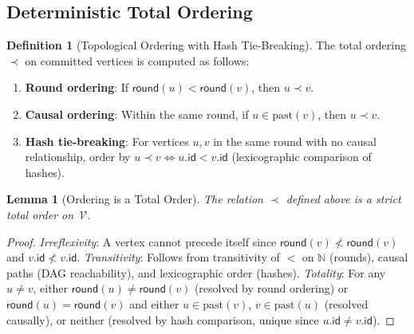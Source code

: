 \documentclass[11pt,a4paper]{article}
\newtheorem{lemma}[theorem]{Lemma}
\theoremstyle{definition}
\newtheorem{definition}[theorem]{Definition}
\theoremstyle{remark}
\newcommand{\past}{\mathrm{past}}
\newcommand{\vertices}{\mathcal{V}}
\newcommand{\round}{\mathsf{round}}
\newcommand{\order}{\prec}
\begin{document}
\subsection{Deterministic Total Ordering}\label{sec:ordering}

\begin{definition}[Topological Ordering with Hash Tie-Breaking]\label{def:ordering}
The total ordering $\order$ on committed vertices is computed as follows:
\begin{enumerate}[nosep]
  \item \textbf{Round ordering}: If $\round(u) < \round(v)$, then $u \order v$.
  \item \textbf{Causal ordering}: Within the same round, if $u \in \past(v)$,
    then $u \order v$.
  \item \textbf{Hash tie-breaking}: For vertices $u, v$ in the same round
    with no causal relationship, order by
    $u \order v \iff u.\mathsf{id} < v.\mathsf{id}$
    (lexicographic comparison of hashes).
\end{enumerate}
\end{definition}

\begin{lemma}[Ordering is a Total Order]\label{lem:total-order}
The relation $\order$ defined above is a strict total order on~$\vertices$.
\end{lemma}

\begin{proof}
\emph{Irreflexivity}: A vertex cannot precede itself since $\round(v) \not< \round(v)$
and $v.\mathsf{id} \not< v.\mathsf{id}$.
\emph{Transitivity}: Follows from transitivity of $<$ on $\mathbb{N}$
(rounds), causal paths (DAG reachability), and lexicographic order (hashes).
\emph{Totality}: For any $u \neq v$, either $\round(u) \neq \round(v)$
(resolved by round ordering) or $\round(u) = \round(v)$ and either
$u \in \past(v)$, $v \in \past(u)$ (resolved causally), or neither
(resolved by hash comparison, unique since $u.\mathsf{id} \neq v.\mathsf{id}$).
\end{proof}
\end{document}

